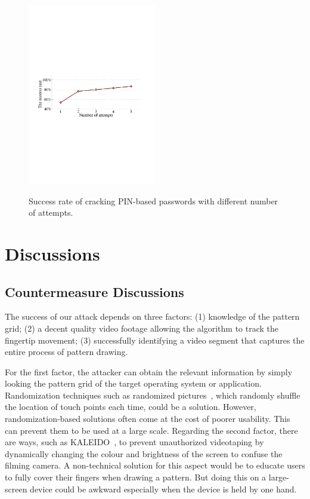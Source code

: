     \begin{figure}[!t]
        \centering
        \includegraphics[width=0.5\textwidth]{fig/pin_results}\\
        \caption{Success rate of cracking PIN-based passwords with different number of attempts.}
        \label{fig:pin_results}
    \end{figure}

\section{Discussions}

\subsection{Countermeasure Discussions}

The success of our attack depends on three factors: (1)
knowledge of the pattern grid; (2) a decent
quality video footage allowing the algorithm to track the fingertip movement;
(3) successfully identifying a video segment that captures the entire process of pattern drawing.

For the first factor, the attacker can obtain the relevant information by simply looking the pattern grid
of the target operating system or application.
Randomization techniques such as
randomized pictures~\cite{biddle2012graphical,hossein2015fortifying}, which randomly shuffle the location
of touch points each time, could be a solution.
However, randomization-based solutions often come at the cost of poorer
usability. This can prevent them to be used at a large scale.
Regarding the second factor, there are ways, such as
KALEIDO~\cite{zhang2015kaleido}, to prevent unauthorized videotaping by
dynamically changing the colour and brightness of the screen to confuse the
filming camera. A non-technical solution for this aspect would be to educate users to
fully cover their fingers when drawing a pattern. But doing this on a large-screen device could be awkward especially when the device is held by one hand.



